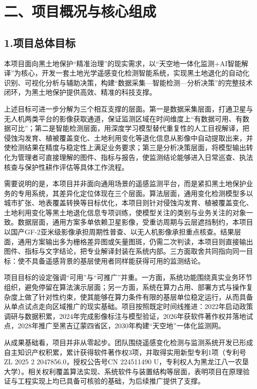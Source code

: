 \section{二、项目概况与核心组成}

\subsection{1.项目总体目标}

本项目面向黑土地保护“精准治理”的现实需求，以“天空地一体化监测+AI智能解译”为核心，开发一套土地光学遥感变化检测智能系统，实现黑土地退化的自动化识别、可视化分析与辅助决策，构建“数据采集—智能检测—分析决策”的完整技术闭环，为黑土地保护提供高效、精准的科技支撑。

上述目标可进一步分解为三个相互支撑的层面。第一是数据采集层面，打通卫星与无人机两类平台的影像获取通道，保证监测区域在时间维度上“有数据可用、有数据可比”；第二是智能检测层面，用深度学习模型替代重复性的人工目视解译，把侵蚀沟发育、植被覆盖变化、土地利用变化等退化信息从影像中自动提取出来，并使检测结果在精度与稳定性上满足业务要求；第三是分析决策层面，将模型输出转化为管理者可直接理解的图件、指标与报告，使监测结论能够进入日常巡查、执法核查与保护性耕作评估等具体工作流程。

需要说明的是，本项目并非面向通用场景的遥感监测平台，而是紧扣黑土地保护业务的专用系统，其差异化定位体现在三个层面。算法层面，通用变化检测模型多以城市扩张、地表覆盖转换等目标优化，本项目则针对侵蚀沟发育、植被覆盖变化、土地利用变化等黑土地退化信息专项训练，使模型关注的类别与业务关注的对象一致。数据层面，通用方案多单依赖卫星影像，受重访周期与云层遮挡制约，本项目以国产GF-2亚米级影像承担周期性普查、以无人机影像承担重点核查。结果层面，通用方案输出多为栅格差异图或矢量图斑，仍需二次判读，本项目则直接输出图件、指标与文字结论，把专业解译封装在系统内部。三方面取舍共同指向同一目标：使不具备遥感背景的基层使用者同样能获得可用的监测结论。

项目目标的设定强调“可用”与“可推广”并重。一方面，系统功能围绕真实业务环节组织，避免停留在算法演示层面；另一方面，系统在算力占用、部署方式与操作复杂度上做了针对性约束，使其能够在算力条件有限的基层单位稳定运行，从而具备从单点试点走向区域推广的现实基础。项目按照既定时间线推进：2022年启动政策调研与数据积累，2024年完成影像标注与模型验证，2026年获软件著作权并落地试点，2028年推广至黑吉辽蒙四省区，2030年构建“天空地”一体化监测网。

从成果基础看，项目并非从零起步。团队围绕遥感变化检测与监测系统开发已形成自主知识产权积累，累计获得软件著作权3项，并取得实用新型专利1项（专利号ZL 2025 2 2047856.0，授权公告号CN 224511490 U，专利权人为黑龙江八一农垦大学）。相关权利覆盖算法实现、系统软件与装置结构等层面，表明项目在原理验证与工程实现上均已具备可核验的基础，为后续推广提供了支撑。

